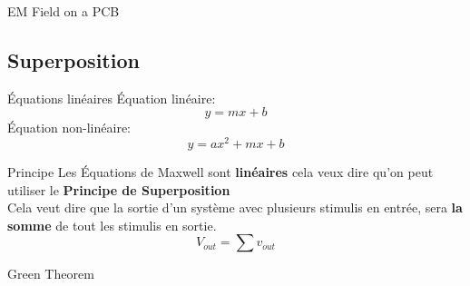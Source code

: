 \begin{frame}{EM Field on a PCB}
    \vspace{-20pt}
\end{frame}

\subsection[1min - Max]{Superposition }

\begin{frame}{Équations linéaires}
    Équation linéaire:
    \begin{equation}
        y = mx+b
    \end{equation}
    Équation non-linéaire:
    \begin{equation}
        y = ax^2 + mx + b
    \end{equation}
\end{frame}

\begin{frame}{Principe}
    Les Équations de Maxwell sont \textbf{linéaires} cela veux dire qu'on peut utiliser le \textbf{Principe de Superposition}\\
    \vspace{20pt}
    Cela veut dire que la sortie d'un système avec plusieurs stimulis en entrée, sera \textbf{la somme} de tout les stimulis en sortie.\\
    \vspace{20pt}
    \begin{equation}
        V_{out} = \sum v_{out}
    \end{equation}
\end{frame}

\begin{frame}{Green Theorem}
    \begin{twocolumns}[0.5]
        \leftcol
        \rightcol
    \end{twocolumns}
\end{frame}

